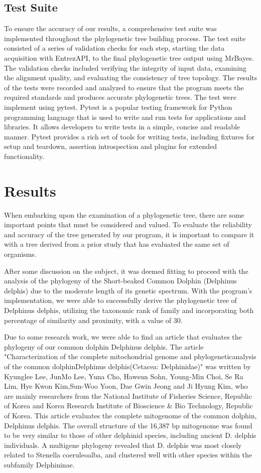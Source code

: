 \documentclass[12pt]{article}
\begin{document}
\subsection{Test Suite}
To ensure the accuracy of our results, a comprehensive test suite was implemented throughout the phylogenetic tree building process. The test suite consisted of a series of validation checks for each step, starting the data acquisition with EntrezAPI, to the final phylogenetic tree output using MrBayes. The validation checks included verifying the integrity of input data, examining the alignment quality, and evaluating the consistency of tree topology. The results of the tests were recorded and analyzed to ensure that the program meets the required standards and produces accurate phylogenetic trees. The test were implement using pytest. Pytest is a popular testing framework for Python programming language that is used to write and run tests for applications and libraries. It allows developers to write tests in a simple, concise and readable manner. Pytest provides a rich set of tools for writing tests, including fixtures for setup and teardown, assertion introspection and plugins for extended functionality.

\section{Results}\label{sec:desenvolvimentos}
When embarking upon the examination of a phylogenetic tree, there are some important points that must be considered and valued. To evaluate the reliability and accuracy of the tree generated by our program, it is important to compare it with a tree derived from a prior study that has evaluated the same set of organisms.

After some discussion on the subject, it was deemed fitting to proceed with the analysis of the phylogeny of the Short-beaked Common Dolphin (Delphinus delphis) due to the moderate length of its genetic spectrum. With the program's implementation, we were able to successfully derive the phylogenetic tree of Delphinus delphis, utilizing the taxonomic rank of family and incorporating both percentage of similarity and proximity, with a value of 30.

Due to some research work, we were able to find an article that evaluates the phylogeny of our common dolphin Delphinus delphis. The article "Characterization of the complete mitochondrial genome and phylogeneticanalysis of the common dolphinDelphinus delphis(Cetacea: Delphinidae)" was written by Kyunglee Lee, JunMo Lee, Yuna Cho, Hawsun Sohn, Young-Min Choi, Se Ra Lim, Hye Kwon Kim,Sun-Woo Yoon, Dae Gwin Jeong and Ji Hyung Kim, who are mainly researchers from the National Institute of Fisheries Science, Republic of Korea and Korea Research Institute of Bioscience \& Bio Technology, Republic of Korea. This article evaluates the complete mitogenome of the common dolphin, Delphinus delphis. The overall structure of the 16,387 bp mitogenome was found to be very similar to those of other delphinid species, including ancient D. delphis individuals. A multigene phylogeny revealed that D. delphis was most closely related to Stenella coeruleoalba, and clustered well with other species within the subfamily Delphininae.
\end{document}
